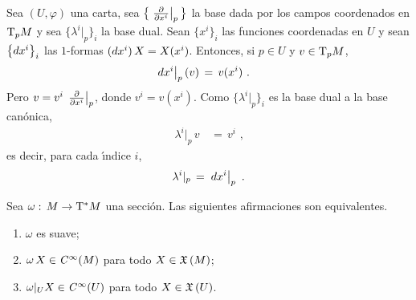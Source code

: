 \begin{obsBaseEnElCotangente}\label{obs:baseenelcotangente}
	Sea $(U,\varphi)$ una carta, sea $\big\{\gancho[p]{x^i}\big\}$ la base
	dada por los campos coordenados en $\tangente[p]{M}$ y sea
	$\big\{\lambda^i|_p\big\}_i$ la base dual. Sean $\{x^i\}_i$ las
	funciones coordenadas en $U$ y sean $\big\{\de{x^i}\big\}_i$ las
	$1$-formas $(\de{x^i})\,X=X(x^i)$. Entonces, si $p\in U$ y
	$v\in\tangente[p]{M}$,
	\begin{align*}
		\de[p]{x^i}(v) & \,=\,v(x^i)
		\text{ .}
	\end{align*}
	Pero $v=v^i\,\gancho[p]{x^i}$, donde $v^i=v(x^i)$. Como
	$\big\{\lambda^i|_p\big\}_i$ es la base dual a la base can\'{o}nica,
	\begin{align*}
		\lambda^i|_p\,v & \,=\,v^i
		\text{ ,}
	\end{align*}
	es decir, para cada \'{\i}ndice $i$,
	\begin{equation}\label{eq:baseenelcotangente}
		\lambda^i|_p \,=\,\de[p]{x^i}
		\text{ .}
	\end{equation}
\end{obsBaseEnElCotangente}

\begin{propoEquivalenciaSuavidadFormas}\label{propo:equivalenciasuavidadformas}
	Sea $\omega:\,M\rightarrow\tangente*{M}$ una secci\'{o}n. Las
	siguientes afirmaciones son equivalentes.
	\begin{enumerate}
		\item\label{propo:equivalenciasuavidadformas:seccion}
			$\omega$ es suave;
		\item\label{propo:equivalenciasuavidadformas:global}
			$\omega\,X\in\mathit{C}^{\infty}(M)$ para todo $X\in\mathfrak{X}\left(M\right)$;
		\item\label{propo:equivalenciasuavidadformas:entornos}
			$\omega|_UX\in\mathit{C}^{\infty}(U)$ para todo $X\in\mathfrak{X}\left(U\right)$.
	\end{enumerate}
\end{propoEquivalenciaSuavidadFormas}

